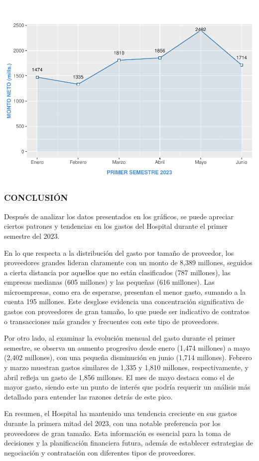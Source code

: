 \documentclass[
]{article}
\begin{document}
\includegraphics{GastoPrimerSemestre2023_files/figure-latex/grafico-mes-1.pdf}
\newpage 

\hypertarget{conclusiuxf3n}{%
\subsubsection{CONCLUSIÓN}\label{conclusiuxf3n}}

Después de analizar los datos presentados en los gráficos, se puede
apreciar ciertos patrones y tendencias en los gastos del Hospital
durante el primer semestre del 2023.

En lo que respecta a la distribución del gasto por tamaño de proveedor,
los proveedores grandes lideran claramente con un monto de 8,389
millones, seguidos a cierta distancia por aquellos que no están
clasificados (787 millones), las empresas medianas (605 millones) y las
pequeñas (616 millones). Las microempresas, como era de esperarse,
presentan el menor gasto, sumando a la cuenta 195 millones. Este
desglose evidencia una concentración significativa de gastos con
proveedores de gran tamaño, lo que puede ser indicativo de contratos o
transacciones más grandes y frecuentes con este tipo de proveedores.

Por otro lado, al examinar la evolución mensual del gasto durante el
primer semestre, se observa un aumento progresivo desde enero (1,474
millones) a mayo (2,402 millones), con una pequeña disminución en junio
(1,714 millones). Febrero y marzo muestran gastos similares de 1,335 y
1,810 millones, respectivamente, y abril refleja un gasto de 1,856
millones. El mes de mayo destaca como el de mayor gasto, siendo este un
punto de interés que podría requerir un análisis más detallado para
entender las razones detrás de este pico.

En resumen, el Hospital ha mantenido una tendencia creciente en sus
gastos durante la primera mitad del 2023, con una notable preferencia
por los proveedores de gran tamaño. Esta información es esencial para la
toma de decisiones y la planificación financiera futura, además de
establecer estrategias de negociación y contratación con diferentes
tipos de proveedores.
\end{document}
